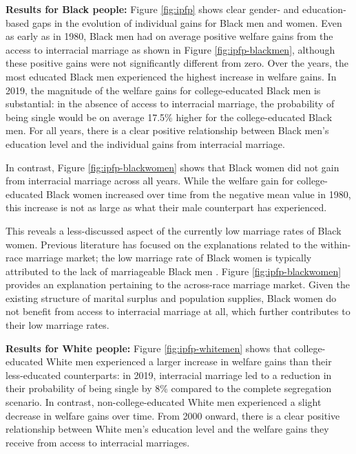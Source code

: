 \vspace{3mm}
\noindent\textbf{Results for Black people:} Figure \ref{fig:ipfp} shows clear gender- and education-based gaps in the evolution of individual gains for Black men and women. Even as early as in 1980, Black men had on average positive welfare gains from the access to interracial marriage as shown in Figure \ref{fig:ipfp-blackmen}, although these positive gains were not significantly different from zero. Over the years, the most educated Black men experienced the highest increase in welfare gains.  In 2019, the magnitude of the welfare gains for college-educated Black men is substantial:  in the absence of access to interracial marriage, the probability of being single would be on average 17.5\% higher for the college-educated Black men. For all years, there is a clear positive relationship between Black men's education level and the individual gains from interracial marriage. 

 In contrast, Figure \ref{fig:ipfp-blackwomen} shows that Black women did not gain from interracial marriage across all years. While the welfare gain for college-educated Black women increased over time from the negative mean value in 1980, this increase is not as large as what their male counterpart has experienced.

This reveals a less-discussed aspect of the currently low marriage rates of Black women. Previous literature has focused on the explanations related to the within-race marriage market; the low marriage rate of Black women is typically attributed to the lack of marriageable Black men \citep{CharlesLuoh_2010_MaleIncarcerationMarriage, Liu_2020_Incarceration, CaucuttGunerRauh_2021_BlackWhiteMarraigeGap}. Figure \ref{fig:ipfp-blackwomen} provides an explanation pertaining to the across-race marriage market. Given the existing structure of marital surplus and population supplies, Black women do not benefit from access to interracial marriage at all, which further contributes to their low marriage rates. 



\vspace{4mm}
\noindent\textbf{Results for White people:} Figure \ref{fig:ipfp-whitemen} shows that college-educated White men experienced a larger increase in welfare gains than their less-educated counterparts: in 2019,  interracial marriage led to a reduction in their probability of being single by 8\% compared to the complete segregation scenario. In contrast, non-college-educated White men experienced a slight decrease in welfare gains over time. From 2000 onward, there is a clear positive relationship between White men's education level and the welfare gains they receive from access to interracial marriages.  

